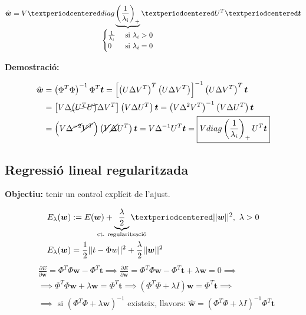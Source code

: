 \documentclass[a4paper]{article}
\begin{document}
$$
\hat{\boldsymbol{w}} = V · diag \underbrace{\left( \frac{1}{\lambda_i}\right)_+}_{
	\mathclap{
		\begin{cases}
			\frac{1}{\lambda_i} &\text{ si } \lambda_i > 0 \\
			0 & \text{ si } \lambda_i = 0
		\end{cases}}} · U^T · \boldsymbol{t}
$$

\textbf{Demostració:}

\begin{align*}
\hat{\boldsymbol{w}} &= \left( \Phi^T \Phi \right)^{-1} \Phi^T \boldsymbol{t} =
\left[ \left( U \Delta V^T \right)^T \left( U\Delta V^T \right) \right]^{-1}
\left(U\Delta V^T\right)^T \boldsymbol{t} \\
& = \left[ V\Delta \cancel{\left( U^T U \right)} \Delta V^T \right] 
\left( V \Delta U^T \right) \boldsymbol{t} = 
\left( V \Delta^2 V^T \right)^{-1} \left( V \Delta U^T \right) \boldsymbol{t} \\ 
&=
\left( V \Delta^{\cancel{-2}} \cancel{V^T} \right) \left( \cancel{V} \cancel{\Delta} U^T \right) \boldsymbol{t} =
V \Delta^{-1} U^T \boldsymbol{t} = 
\boxed{V diag\left(\frac{1}{\lambda_i}\right)_+ U^T \boldsymbol{t}}
\end{align*}

\subsection{Regressió lineal regularitzada}

\textbf{Objectiu:} tenir un control explícit de l'ajust.

\begin{align*}
    & E_{\lambda} (\boldsymbol{w}) := E(\boldsymbol{w}) + \underbrace{\frac{\lambda}{2}}_{\mathclap{\text{ct. regularització}}}·||\boldsymbol{w}||^2, \ \lambda > 0 \\
    & E_{\lambda}(\boldsymbol{w}) = \frac{1}{2} || t - \Phi w ||^2 + \frac{\lambda}{2} || \boldsymbol{w} ||^2
\end{align*}
\begin{align*}
    & \frac{\partial E}{\partial \boldsymbol{w}} = 
    \Phi^T \Phi \boldsymbol{w} - \Phi^T \boldsymbol{t} \implies
    \frac{\partial E}{\partial \boldsymbol{w}} = 
    \Phi^T \Phi \boldsymbol{w} - \Phi^T \boldsymbol{t} + \lambda \boldsymbol{w} = 0 \implies \\
    & \implies \Phi^T \Phi \boldsymbol{w} + \lambda \boldsymbol{w} = \Phi^T \boldsymbol{t} \implies
    \left( \Phi^T \Phi + \lambda I \right) \boldsymbol{w} = \Phi^T \boldsymbol{t} \implies \\
    & \implies \text{ si } \left( \Phi^T \Phi + \lambda \boldsymbol{w} \right)^{-1} 
    \text{ existeix, llavors: } \hat{\boldsymbol{w}} = 
    \left( \Phi^T \Phi + \lambda I \right)^{-1} \Phi^T \boldsymbol{t}
\end{align*}
\end{document}
